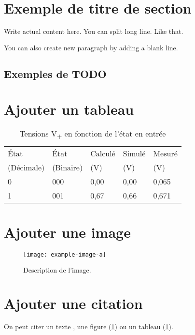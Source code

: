\section{Exemple de titre de section}

Write actual content here.
You can split long line.
Like that.

You can also create new paragraph by adding a blank line.

\subsection{Exemples de TODO}


\section{Ajouter un tableau}

\begin{table}[h!]
    \centering
    \begin{tabular}{lllll}
        \hline
        État      & État      & Calculé & Simulé & Mesuré\\
        (Décimale)& (Binaire) & (V)     & (V)    & (V)\\
        \hline\hline
        0 & 000 & 0,00 & 0,00 & 0,065\\
        1 & 001 & 0,67 & 0,66 & 0,671\\
        \hline
    \end{tabular}
    \caption{Tensions V\textsubscript{+} en fonction de l'état en entrée}
    \label{tab:template-Vout}
\end{table}

\section{Ajouter une image}

\begin{figure}[h!]
    \centering
    \texttt{[image: example-image-a]}
    \caption{Description de l'image.}
    \label{fig:template-example}
\end{figure}

\section{Ajouter une citation}

On peut citer
un texte \cite{boutin_en_2009},
une figure (\ref{fig:template-example}) ou
un tableau (\ref{tab:template-Vout}).